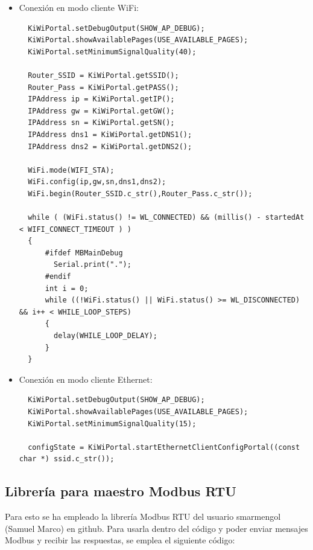 \begin{itemize}
  \item Conexión en modo cliente WiFi:
  
\begin{lstlisting}
  KiWiPortal.setDebugOutput(SHOW_AP_DEBUG);
  KiWiPortal.showAvailablePages(USE_AVAILABLE_PAGES);
  KiWiPortal.setMinimumSignalQuality(40);

  Router_SSID = KiWiPortal.getSSID();
  Router_Pass = KiWiPortal.getPASS();
  IPAddress ip = KiWiPortal.getIP();
  IPAddress gw = KiWiPortal.getGW();
  IPAddress sn = KiWiPortal.getSN();
  IPAddress dns1 = KiWiPortal.getDNS1();
  IPAddress dns2 = KiWiPortal.getDNS2();

  WiFi.mode(WIFI_STA);
  WiFi.config(ip,gw,sn,dns1,dns2);
  WiFi.begin(Router_SSID.c_str(),Router_Pass.c_str());
  
  while ( (WiFi.status() != WL_CONNECTED) && (millis() - startedAt < WIFI_CONNECT_TIMEOUT ) )
  {
      #ifdef MBMainDebug
        Serial.print(".");
      #endif 
      int i = 0;
      while ((!WiFi.status() || WiFi.status() >= WL_DISCONNECTED) && i++ < WHILE_LOOP_STEPS)
      {
        delay(WHILE_LOOP_DELAY);
      }
  }
\end{lstlisting}
    
    \item Conexión en modo cliente Ethernet:
  
\begin{lstlisting}
  KiWiPortal.setDebugOutput(SHOW_AP_DEBUG);
  KiWiPortal.showAvailablePages(USE_AVAILABLE_PAGES);
  KiWiPortal.setMinimumSignalQuality(15);

  configState = KiWiPortal.startEthernetClientConfigPortal((const char *) ssid.c_str());
\end{lstlisting}  

\end{itemize}

\subsection{Librería para maestro Modbus RTU}
\label{subsec:maestroRTUkiwi}

Para esto se ha empleado la librería Modbus RTU del usuario smarmengol (Samuel Marco) en github. Para usarla dentro del código y poder enviar mensajes Modbus y recibir las respuestas, se emplea el siguiente código:

